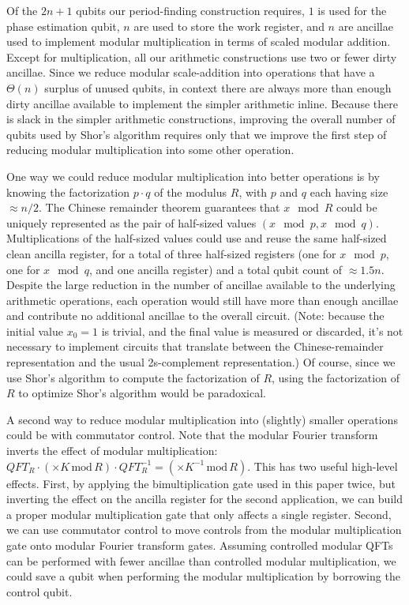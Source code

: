 \documentclass[twocolumn,longbibliography]{quantumarticle-customized}
\begin{document}
Of the $2n+1$ qubits our period-finding construction requires, $1$ is used for the phase estimation qubit, $n$ are used to store the work register, and $n$ are ancillae used to implement modular multiplication in terms of scaled modular addition.
Except for multiplication, all our arithmetic constructions use two or fewer dirty ancillae.
Since we reduce modular scale-addition into operations that have a $\Theta(n)$ surplus of unused qubits, in context there are always more than enough dirty ancillae available to implement the simpler arithmetic inline.
Because there is slack in the simpler arithmetic constructions, improving the overall number of qubits used by Shor's algorithm requires only that we improve the first step of reducing modular multiplication into some other operation.

One way we could reduce modular multiplication into better operations is by knowing the factorization $p \cdot q$ of the modulus $R$, with $p$ and $q$ each having size $\approx n/2$.
The Chinese remainder theorem guarantees that $x \mod R$ could be uniquely represented as the pair of half-sized values $(x \mod p, x \mod q)$.
Multiplications of the half-sized values could use and reuse the same half-sized clean ancilla register, for a total of three half-sized registers (one for $x \mod p$, one for $x \mod q$, and one ancilla register) and a total qubit count of $\approx 1.5n$.
Despite the large reduction in the number of ancillae available to the underlying arithmetic operations, each operation would still have more than enough ancillae and contribute no additional ancillae to the overall circuit.
(Note: because the initial value $x_0 = 1$ is trivial, and the final value is measured or discarded, it's not necessary to implement circuits that translate between the Chinese-remainder representation and the usual 2s-complement representation.)
Of course, since we use Shor's algorithm to compute the factorization of $R$, using the factorization of $R$ to optimize Shor's algorithm would be paradoxical.

A second way to reduce modular multiplication into (slightly) smaller operations could be with commutator control.
Note that the modular Fourier transform inverts the effect of modular multiplication: $QFT_{R} \cdot (\times K \,\text{mod}\, R) \cdot QFT_R^{-1} = (\times K^{-1} \,\text{mod}\, R)$.
This has two useful high-level effects.
First, by applying the bimultiplication gate used in this paper twice, but inverting the effect on the ancilla register for the second application, we can build a proper modular multiplication gate that only affects a single register.
Second, we can use commutator control to move controls from the modular multiplication gate onto modular Fourier transform gates.
Assuming controlled modular QFTs can be performed with fewer ancillae than controlled modular multiplication, we could save a qubit when performing the modular multiplication by borrowing the control qubit.
\end{document}
